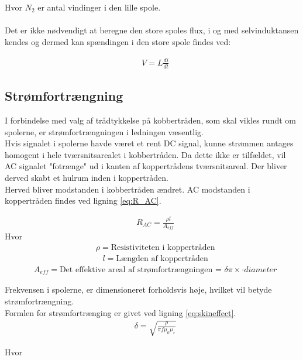 Hvor $N_2$ er antal vindinger i den lille spole.
\\ \\
Det er ikke nødvendigt at beregne den store spoles flux, i og med selvinduktansen kendes og dermed kan spændingen i den store spole findes ved:

\begin{align}
	&V = L\frac{di}{dt} \label{eq:ldidt}
\end{align}

\subsection{Strømfortrængning}\label{Sec_skineff.}
I forbindelse med valg af trådtykkelse på kobbertråden, som skal vikles rundt om spolerne, er strømfortrængningen i ledningen væsentlig.\\
Hvis signalet i spolerne havde været et rent DC signal, kunne strømmen antages homogent i hele tværsnitsarealet i kobbertråden.
Da dette ikke er tilfældet, vil AC signalet "fotrænge" ud i kanten af koppertrådens tværsnitsareal. 
Der bliver derved skabt et hulrum inden i koppertråden. \\
Herved bliver modstanden i kobbertråden ændret.
AC modstanden i koppertråden findes ved ligning \ref{eq:R_AC}.

\begin{align}
	& R_{AC}=\frac{\rho l}{A_{eff}} \label{eq:R_AC}
\end{align}
Hvor
\begin{align}
	& \rho = \text{Resistiviteten i koppertråden} \nonumber
\end{align}
\begin{align}
	& l = \text{Længden af koppertråden} \nonumber
\end{align}
\begin{align}
	& A_{eff} = \text{Det effektive areal af strømfortrængningen = $\delta\pi\times\cdot diameter$} \nonumber
\end{align}
	
Frekvensen i spolerne, er dimensioneret forholdsvis høje, hvilket vil betyde strømfortrængning.  \\
Formlen for strømfortrænging er givet ved ligning \ref{eq:skineffect}.
\begin{align}
	& \delta = \sqrt{\frac{\rho}{\pi f\mu_0\mu_r}} \label{eq:skineffect}
\end{align}

Hvor 



